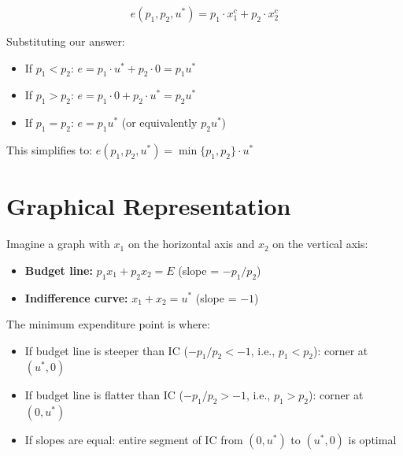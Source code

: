 \documentclass[11pt]{article}
\begin{document}
\begin{equation}
e(p_1, p_2, u^*) = p_1 \cdot x_1^c + p_2 \cdot x_2^c
\end{equation}

Substituting our answer:
\begin{itemize}
\item If $p_1 < p_2$: $e = p_1 \cdot u^* + p_2 \cdot 0 = p_1 u^*$
\item If $p_1 > p_2$: $e = p_1 \cdot 0 + p_2 \cdot u^* = p_2 u^*$
\item If $p_1 = p_2$: $e = p_1 u^*$ (or equivalently $p_2 u^*$)
\end{itemize}

This simplifies to: $e(p_1, p_2, u^*) = \min\{p_1, p_2\} \cdot u^*$

\section{Graphical Representation}

Imagine a graph with $x_1$ on the horizontal axis and $x_2$ on the vertical axis:

\begin{itemize}
\item \textbf{Budget line:} $p_1 x_1 + p_2 x_2 = E$ (slope = $-p_1/p_2$)
\item \textbf{Indifference curve:} $x_1 + x_2 = u^*$ (slope = $-1$)
\end{itemize}

The minimum expenditure point is where:
\begin{itemize}
\item If budget line is steeper than IC ($-p_1/p_2 < -1$, i.e., $p_1 < p_2$): corner at $(u^*, 0)$
\item If budget line is flatter than IC ($-p_1/p_2 > -1$, i.e., $p_1 > p_2$): corner at $(0, u^*)$
\item If slopes are equal: entire segment of IC from $(0, u^*)$ to $(u^*, 0)$ is optimal
\end{itemize}
\end{document}
